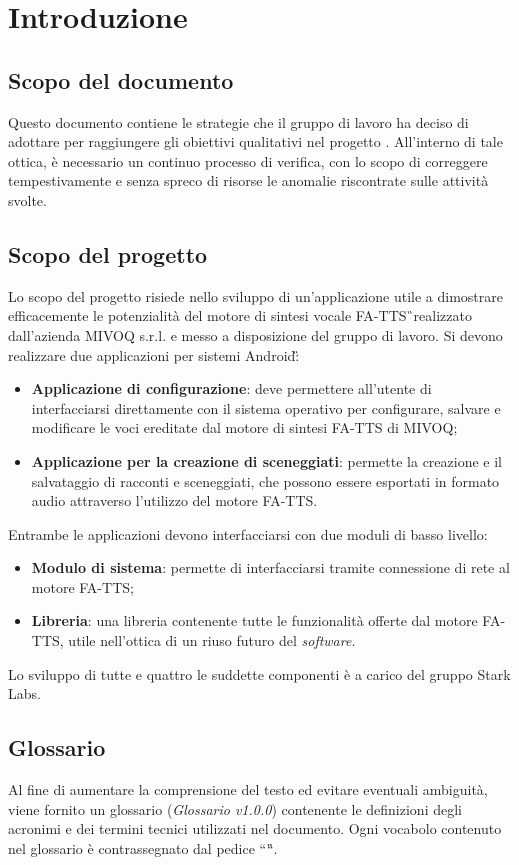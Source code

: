 \section{Introduzione}

\subsection{Scopo del documento}
Questo documento contiene le strategie che il gruppo di lavoro 
ha deciso di adottare per raggiungere gli obiettivi qualitativi nel progetto \PROGETTO. 
All'interno di tale ottica, è necessario un continuo processo di verifica, 
con lo scopo di correggere tempestivamente e senza spreco di risorse le anomalie riscontrate sulle attività svolte.


\subsection{Scopo del progetto}
Lo scopo del progetto risiede nello sviluppo di un'applicazione utile a dimostrare efficacemente
le potenzialità del motore di sintesi vocale FA-TTS\G\ realizzato dall'azienda MIVOQ s.r.l. e messo a disposizione del gruppo di lavoro. Si devono realizzare due applicazioni per sistemi Android\G:
\begin{itemize}
	\item \textbf{Applicazione di configurazione}: deve permettere all'utente di interfacciarsi direttamente con il sistema operativo per configurare, salvare e modificare le voci ereditate dal motore di sintesi FA-TTS di MIVOQ;
	\item \textbf{Applicazione per la creazione di sceneggiati}: permette la creazione e il salvataggio di racconti e sceneggiati, che possono essere esportati in formato audio attraverso l'utilizzo del motore FA-TTS.
\end{itemize}
Entrambe le applicazioni devono interfacciarsi con due moduli di basso livello:
\begin{itemize}
	\item \textbf{Modulo di sistema}: permette di interfacciarsi tramite connessione di rete al motore FA-TTS;
	\item \textbf{Libreria}: una libreria contenente tutte le funzionalità offerte dal motore FA-TTS, utile nell'ottica di un riuso futuro del \textit{software}.
\end{itemize} 
Lo sviluppo di tutte e quattro le suddette componenti è a carico del gruppo Stark Labs.

\subsection{Glossario}
Al fine di aumentare la comprensione del testo ed evitare eventuali ambiguità, 
viene fornito un glossario (\textit{Glossario v1.0.0}) contenente le 
definizioni degli acronimi e dei termini tecnici utilizzati nel documento. Ogni 
vocabolo contenuto nel glossario è contrassegnato dal pedice “\G “.

